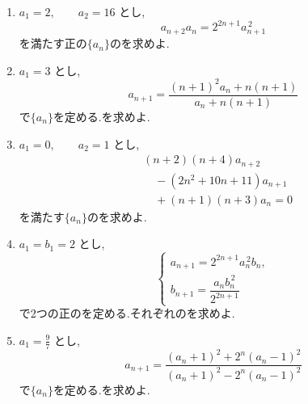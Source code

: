 \begin{enumerate}[label=\textbf{問\arabic*.},leftmargin=3.8em,format=\bookitemlink{practice-advanced}{problem}{answer}]
\begin{align*}
                  &\quad+\frac{3(a_n-b_n)}
                      {2\{3+(n+1)(a_n-b_n)\}},\\
                 b_{n+1}
                  &=(n+1)(a_n+b_n)\\
                  &\quad-\frac{3(a_n-b_n)}
                      {2\{3+(n+1)(a_n-b_n)\}}
                \end{align*}
                で2つのを定める.それぞれのを求めよ.
          \item $\displaystyle a_1=2,\qquad a_2=16$ とし,
                \[
                  a_{n+2}a_n=2^{2n+1}a_{n+1}^{\,2}
                \]
                を満たす正の$\{a_n\}$のを求めよ.
          \item $\displaystyle a_1=3$ とし,
                \[
                  a_{n+1}
                   =\frac{(n+1)^2a_n+n(n+1)}
                          {a_n+n(n+1)}
                \]
                で$\{a_n\}$を定める.を求めよ.
          \item $\displaystyle a_1=0,\qquad a_2=1$ とし,
                \begin{align*}
                 &(n+2)(n+4)a_{n+2}\\
                 &\quad-(2n^2+10n+11)a_{n+1}\\
                 &\quad+(n+1)(n+3)a_n=0
                \end{align*}
                を満たす$\{a_n\}$のを求めよ.
          \item $\displaystyle a_1=b_1=2$ とし,
                \[
                 \begin{cases}
                  a_{n+1}=2^{2n+1}a_n^{\,2}b_n,\\
                  b_{n+1}=\dfrac{a_nb_n^{\,2}}{2^{2n+1}}
                 \end{cases}
                \]
                で2つの正のを定める.それぞれのを求めよ.
          \item $\displaystyle a_1=\frac97$ とし,
                \[
                  a_{n+1}
                   =\frac{(a_n+1)^2+2^n(a_n-1)^2}
                          {(a_n+1)^2-2^n(a_n-1)^2}
                \]
                で$\{a_n\}$を定める.を求めよ.
        \end{enumerate}

